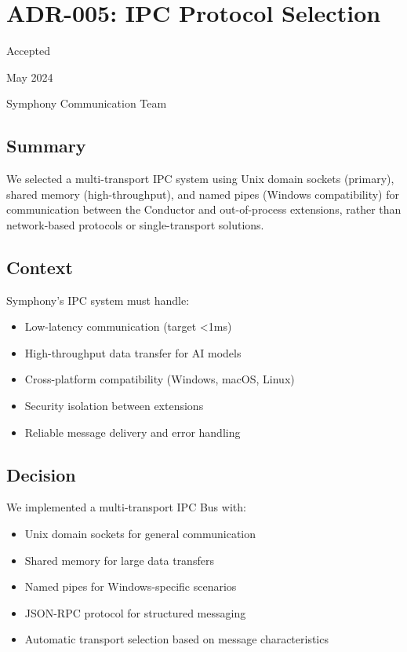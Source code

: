 \section*{ADR-005: IPC Protocol Selection}

\begin{description}[leftmargin=3cm,labelwidth=2.5cm]
\item[\textbf{Status}] Accepted
\item[\textbf{Date}] May 2024
\item[\textbf{Authors}] Symphony Communication Team
\end{description}

\subsection*{Summary}

We selected a multi-transport IPC system using Unix domain sockets (primary), shared memory (high-throughput), and named pipes (Windows compatibility) for communication between the Conductor and out-of-process extensions, rather than network-based protocols or single-transport solutions.

\subsection*{Context}

Symphony's IPC system must handle:
\begin{itemize}
\item Low-latency communication (target <1ms)
\item High-throughput data transfer for AI models
\item Cross-platform compatibility (Windows, macOS, Linux)
\item Security isolation between extensions
\item Reliable message delivery and error handling
\end{itemize}

\subsection*{Decision}

We implemented a multi-transport IPC Bus with:
\begin{itemize}
\item Unix domain sockets for general communication
\item Shared memory for large data transfers
\item Named pipes for Windows-specific scenarios
\item JSON-RPC protocol for structured messaging
\item Automatic transport selection based on message characteristics
\end{itemize}

